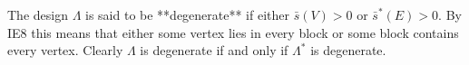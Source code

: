 The design $\Lambda$ is said to be **degenerate** if either $\bar{s}(V) > 0$ or $\bar{s}^*(E) > 0$. By IE8 this means that either some vertex lies in every block or some block contains every vertex. Clearly $\Lambda$ is degenerate if and only if $\Lambda^*$ is degenerate.
